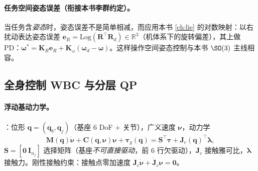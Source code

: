 \paragraph{任务空间姿态误差（衔接本书李群约定）。}
当任务含\emph{姿态}时，姿态误差不是简单相减，而应用本书 \cref{ch:lie} 的对数映射：以右扰动表达姿态误差 $\mathbf{e}_R=\mathrm{Log}(\mathbf{R}^\top\mathbf{R}_d)\in\mathbb{R}^3$（机体系下的旋转偏差），其上做 PD：$\boldsymbol{\omega}^*=\mathbf{K}_R\mathbf{e}_R+\mathbf{K}_\omega(\boldsymbol{\omega}_d-\boldsymbol{\omega})$。这样操作空间姿态控制与本书 $\SO(3)$ 主线相容。

\subsection{全身控制 WBC 与分层 QP}
\label{sec:ctrl-robot-wbc}

\paragraph{浮动基动力学。}
：位形 $\mathbf{q}=(\mathbf{q}_b,\mathbf{q}_j)$（基座 6 DoF + 关节），广义速度 $\boldsymbol{\nu}$，动力学
\begin{equation}
  \mathbf{M}(\mathbf{q})\dot{\boldsymbol{\nu}}+\mathbf{C}(\mathbf{q},\boldsymbol{\nu})\boldsymbol{\nu}+\boldsymbol{\tau}_g(\mathbf{q})=\mathbf{S}^\top\boldsymbol{\tau}+\mathbf{J}_c(\mathbf{q})^\top\boldsymbol{\lambda},
  \label{eq:ctrl-floatbase}
\end{equation}
$\mathbf{S}=[\mathbf{0}\ \mathbf{I}_{n_j}]$ 选择矩阵（基座\emph{不可直接驱动}，前 6 行欠驱动），$\mathbf{J}_c$ 接触雅可比，$\boldsymbol{\lambda}$ 接触力。刚性接触约束：接触点零加速度 $\mathbf{J}_c\dot{\boldsymbol{\nu}}+\dot{\mathbf{J}}_c\boldsymbol{\nu}=\mathbf{0}$。

